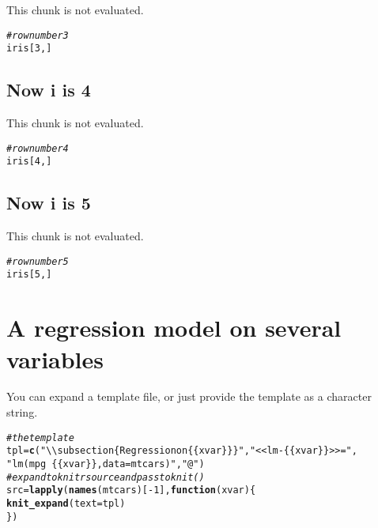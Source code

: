 \documentclass{article}\usepackage[]{graphicx}\usepackage[]{color}
\makeatletter
\newcommand{\hlnum}[1]{\textcolor[rgb]{0.686,0.059,0.569}{#1}}%
\newcommand{\hlstr}[1]{\textcolor[rgb]{0.192,0.494,0.8}{#1}}%
\newcommand{\hlcom}[1]{\textcolor[rgb]{0.678,0.584,0.686}{\textit{#1}}}%
\newcommand{\hlopt}[1]{\textcolor[rgb]{0,0,0}{#1}}%
\newcommand{\hlstd}[1]{\textcolor[rgb]{0.345,0.345,0.345}{#1}}%
\newcommand{\hlkwa}[1]{\textcolor[rgb]{0.161,0.373,0.58}{\textbf{#1}}}%
\newcommand{\hlkwb}[1]{\textcolor[rgb]{0.69,0.353,0.396}{#1}}%
\newcommand{\hlkwc}[1]{\textcolor[rgb]{0.333,0.667,0.333}{#1}}%
\newcommand{\hlkwd}[1]{\textcolor[rgb]{0.737,0.353,0.396}{\textbf{#1}}}%
\newenvironment{kframe}{%
 \def\at@end@of@kframe{}%
 \ifinner\ifhmode%
  \def\at@end@of@kframe{\end{minipage}}%
  \begin{minipage}{\columnwidth}%
 \fi\fi%
 \def\FrameCommand##1{\hskip\@totalleftmargin \hskip-\fboxsep
 \colorbox{shadecolor}{##1}\hskip-\fboxsep
     \hskip-\linewidth \hskip-\@totalleftmargin \hskip\columnwidth}%
 \MakeFramed {\advance\hsize-\width
   \@totalleftmargin\z@ \linewidth\hsize
   \@setminipage}}%
 {\par\unskip\endMakeFramed%
 \at@end@of@kframe}
\newenvironment{knitrout}{}{} %
\makeatother
\begin{document}
This chunk is not evaluated.
\begin{knitrout}
\color{fgcolor}\begin{kframe}
\begin{alltt}
\hlcom{# row number 3}
\hlstd{iris[}\hlnum{3}\hlstd{, ]}
\end{alltt}
\end{kframe}
\end{knitrout}

\subsection{Now i is 4}

This chunk is not evaluated.
\begin{knitrout}
\color{fgcolor}\begin{kframe}
\begin{alltt}
\hlcom{# row number 4}
\hlstd{iris[}\hlnum{4}\hlstd{, ]}
\end{alltt}
\end{kframe}
\end{knitrout}

\subsection{Now i is 5}

This chunk is not evaluated.
\begin{knitrout}
\color{fgcolor}\begin{kframe}
\begin{alltt}
\hlcom{# row number 5}
\hlstd{iris[}\hlnum{5}\hlstd{, ]}
\end{alltt}
\end{kframe}
\end{knitrout}


\section{A regression model on several variables}

You can expand a template file, or just provide the template as a character string.

\begin{knitrout}
\color{fgcolor}\begin{kframe}
\begin{alltt}
\hlcom{# the template}
\hlstd{tpl} \hlkwb{=} \hlkwd{c}\hlstd{(}\hlstr{"\textbackslash{}\textbackslash{}subsection\{Regression on \{\{xvar\}\}\}"}\hlstd{,} \hlstr{"<<lm-\{\{xvar\}\}>>="}\hlstd{,}
    \hlstr{"lm(mpg~\{\{xvar\}\}, data=mtcars)"}\hlstd{,} \hlstr{"@"}\hlstd{)}
\hlcom{# expand to knitr source and pass to knit()}
\hlstd{src} \hlkwb{=} \hlkwd{lapply}\hlstd{(}\hlkwd{names}\hlstd{(mtcars)[}\hlopt{-}\hlnum{1}\hlstd{],} \hlkwa{function}\hlstd{(}\hlkwc{xvar}\hlstd{) \{}
    \hlkwd{knit_expand}\hlstd{(}\hlkwc{text} \hlstd{= tpl)}
\hlstd{\})}
\end{alltt}
\end{kframe}
\end{knitrout}
\end{document}
